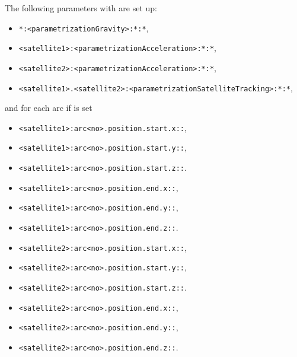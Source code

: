 The following parameters with  are set up:
\begin{itemize}
\item \verb|*:<parametrizationGravity>:*:*|,
\item \verb|<satellite1>:<parametrizationAcceleration>:*:*|,
\item \verb|<satellite2>:<parametrizationAcceleration>:*:*|,
\item \verb|<satellite1>.<satellite2>:<parametrizationSatelliteTracking>:*:*|,
\end{itemize}
and for each arc if  is set
\begin{itemize}
\item \verb|<satellite1>:arc<no>.position.start.x::|,
\item \verb|<satellite1>:arc<no>.position.start.y::|,
\item \verb|<satellite1>:arc<no>.position.start.z::|.
\item \verb|<satellite1>:arc<no>.position.end.x::|,
\item \verb|<satellite1>:arc<no>.position.end.y::|,
\item \verb|<satellite1>:arc<no>.position.end.z::|.
\item \verb|<satellite2>:arc<no>.position.start.x::|,
\item \verb|<satellite2>:arc<no>.position.start.y::|,
\item \verb|<satellite2>:arc<no>.position.start.z::|.
\item \verb|<satellite2>:arc<no>.position.end.x::|,
\item \verb|<satellite2>:arc<no>.position.end.y::|,
\item \verb|<satellite2>:arc<no>.position.end.z::|.
\end{itemize}


